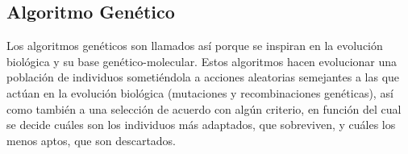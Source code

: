\documentclass[a4paper,10pt,twocolumn]{article}
\begin{document}


\subsection{Algoritmo Genético}

Los algoritmos genéticos son llamados así porque se inspiran en la evolución biológica y su base genético-molecular. Estos algoritmos hacen evolucionar una población de individuos sometiéndola a acciones aleatorias semejantes a las que actúan en la evolución biológica (mutaciones y recombinaciones genéticas), así como también a una selección de acuerdo con algún criterio, en función del cual se decide cuáles son los individuos más adaptados, que sobreviven, y cuáles los menos aptos, que son descartados.\cite{5}
\end{document}
